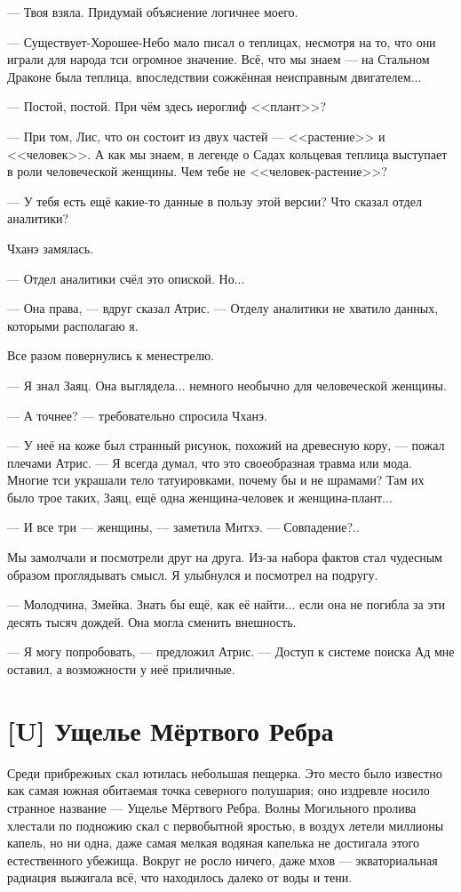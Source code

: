 --- Твоя взяла.
Придумай объяснение логичнее моего.

--- Существует-Хорошее-Небо мало писал о теплицах, несмотря на то, что они играли для народа тси огромное значение.
Всё, что мы знаем --- на Стальном Драконе была теплица, впоследствии сожжённая неисправным двигателем...

--- Постой, постой.
При чём здесь иероглиф <<плант>>?

--- При том, Лис, что он состоит из двух частей --- <<растение>> и <<человек>>.
А как мы знаем, в легенде о Садах кольцевая теплица выступает в роли человеческой женщины.
Чем тебе не <<человек-растение>>?

--- У тебя есть ещё какие-то данные в пользу этой версии?
Что сказал отдел аналитики?

Чханэ замялась.

--- Отдел аналитики счёл это опиской.
Но...

--- Она права, --- вдруг сказал Атрис.
--- Отделу аналитики не хватило данных, которыми располагаю я.

Все разом повернулись к менестрелю.

--- Я знал Заяц.
Она выглядела... немного необычно для человеческой женщины.

--- А точнее? --- требовательно спросила Чханэ.

--- У неё на коже был странный рисунок, похожий на древесную кору, --- пожал плечами Атрис.
--- Я всегда думал, что это своеобразная травма или мода.
Многие тси украшали тело татуировками, почему бы и не шрамами?
Там их было трое таких, Заяц, ещё одна женщина-человек и женщина-плант...

--- И все три --- женщины, --- заметила Митхэ.
--- Совпадение?..

Мы замолчали и посмотрели друг на друга.
Из-за набора фактов стал чудесным образом проглядывать смысл.
Я улыбнулся и посмотрел на подругу.

--- Молодчина, Змейка.
Знать бы ещё, как её найти... если она не погибла за эти десять тысяч дождей.
Она могла сменить внешность.

--- Я могу попробовать, --- предложил Атрис.
--- Доступ к системе поиска Ад мне оставил, а возможности у неё приличные.

\section{[U] Ущелье Мёртвого Ребра}

Среди прибрежных скал ютилась небольшая пещерка.
Это место было известно как самая южная обитаемая точка северного полушария;
оно издревле носило странное название --- Ущелье Мёртвого Ребра.
Волны Могильного пролива хлестали по подножию скал с первобытной яростью, в воздух летели миллионы капель, но ни одна, даже самая мелкая водяная капелька не достигала этого естественного убежища.
Вокруг не росло ничего, даже мхов --- экваториальная радиация выжигала всё, что находилось далеко от воды и тени.

